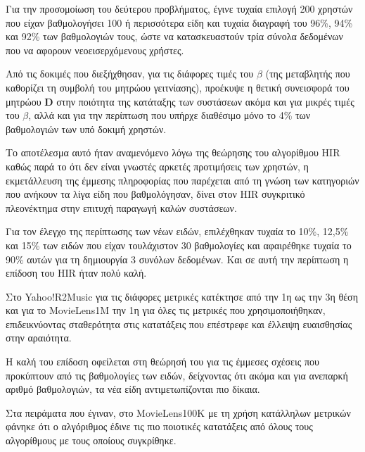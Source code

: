 Για την προσομοίωση του δεύτερου προβλήματος, έγινε τυχαία επιλογή 200 χρηστών που είχαν βαθμολογήσει 100 ή περισσότερα είδη και τυχαία διαγραφή του 96\%, 94\% και 92\% των βαθμολογιών τους, ώστε να κατασκευαστούν τρία σύνολα δεδομένων που να αφορουν νεοεισερχόμενους χρήστες. \par
Από τις δοκιμές που διεξήχθησαν, για τις διάφορες τιμές του $\beta$ (της μεταβλητής που καθορίζει τη συμβολή του μητρώου γειτνίασης), προέκυψε η θετική συνεισφορά του μητρώου $\mathbf{D}$ στην ποιότητα της κατάταξης των συστάσεων ακόμα και για μικρές τιμές του $\beta$, αλλά και για την περίπτωση που υπήρχε διαθέσιμο μόνο το 4\% των βαθμολογιών των υπό δοκιμή χρηστών. \par
Το αποτέλεσμα αυτό ήταν αναμενόμενο λόγω της θεώρησης του αλγορίθμου {\en HIR} καθώς παρά το ότι δεν είναι γνωστές αρκετές προτιμήσεις των χρηστών, η εκμετάλλευση της έμμεσης πληροφορίας που παρέχεται από τη γνώση των κατηγοριών που ανήκουν τα λίγα είδη που βαθμολόγησαν, δίνει στον {\en HIR} συγκριτικό πλεονέκτημα στην επιτυχή παραγωγή καλών συστάσεων. \par
Για τον έλεγχο της περίπτωσης των νέων ειδών, επιλέχθηκαν τυχαία το 10\%, 12,5\% και 15\% των ειδών που είχαν τουλάχιστον 30 βαθμολογίες και αφαιρέθηκε τυχαία το 90\% αυτών για τη δημιουργία 3 συνόλων δεδομένων. Και σε αυτή την περίπτωση η επίδοση του {\en HIR} ήταν πολύ καλή. \par
Στο {\en Yahoo!R2Music} για τις διάφορες μετρικές κατέκτησε από την 1η ως την 3η θέση και για το {\en MovieLens1M} την 1η για όλες τις μετρικές που χρησιμοποιήθηκαν, επιδεικνύοντας σταθερότητα στις κατατάξεις που επέστρεφε και έλλειψη ευαισθησίας στην αραιότητα. \par
Η καλή του επίδοση οφείλεται στη θεώρησή του για τις έμμεσες σχέσεις που προκύπτουν από τις βαθμολογίες των ειδών, δείχνοντας ότι ακόμα και για ανεπαρκή αριθμό βαθμολογιών, τα νέα είδη αντιμετωπίζονται πιο δίκαια. \par
Στα πειράματα που έγιναν, στο {\en MovieLens100K} με τη χρήση κατάλληλων μετρικών φάνηκε ότι ο αλγόριθμος έδινε τις πιο ποιοτικές κατατάξεις από όλους τους αλγορίθμους με τους οποίους συγκρίθηκε. 
